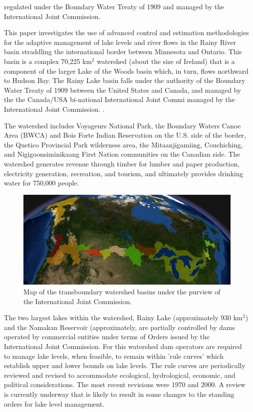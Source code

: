 \documentclass[preprint,times]{elsarticle}
\begin{document}
regulated under the Boundary Water Treaty of 1909 and managed by the International Joint Commission.

This paper investigates the use of advanced control and estimation methodologies for the adaptive management of lake levels and river flows in the Rainy River basin straddling the international border between Minnesota and Ontario. This basin is a complex 70,225 km$^2$ watershed (about the size of Ireland) that is a component of the larger Lake of the Woods basin which, in turn, flows northward to Hudson Bay. The Rainy Lake basin falls under the authority of the Boundary Water Treaty of 1909 between the United States and Canada, and managed by the the Canada/USA bi-national International Joint Commi managed by the International Joint Commission. . 

The watershed includes Voyageurs National Park, the Boundary Waters Canoe Area (BWCA) and Bois Forte Indian Reservation on the U.S. side of the border, the Quetico Provincial Park wilderness area, the Mitaanjigamiing, Couchiching, and Nigigoonsiminikaang First Nation communities on the Canadian side. The watershed generates revenue through timber for lumber and paper production, electricity generation, recreation, and tourism, and ultimately provides drinking water for 750,000 people.

\begin{figure}
\includegraphics[width=\linewidth]{basins_map.png}
\caption{Map of the transboundary watershed basins under the purview of the International Joint Commission.}\label{figure:1}
\end{figure}

The two largest lakes within the watershed, Rainy Lake (approximately 930 km$^2$) and the Namakan Reservoir (approximately, are partially controlled by dams operated by commercial entities under terms of Orders issued by the International Joint Commission. For this watershed dam operators are required to manage lake levels, when feasible, to remain within 'rule curves' which establish upper and lower bounds on lake levels. The rule curves are periodically reviewed and revised to accommodate ecological, hydrological, economic, and political considerations. The most recent revisions were 1970 and 2000. A review is currently underway that is likely to result in some changes to the standing orders for lake level management.
\end{document}
